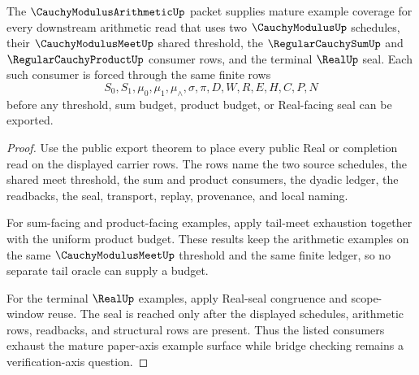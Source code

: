 \begin{theorem}
\label{thm:cauchy-modulus-arithmetic-mature-examples}
The $\CauchyModulusArithmeticUp$ packet supplies mature example coverage for every downstream arithmetic read that uses two $\CauchyModulusUp$ schedules, their $\CauchyModulusMeetUp$ shared threshold, the $\RegularCauchySumUp$ and $\RegularCauchyProductUp$ consumer rows, and the terminal $\RealUp$ seal. Each such consumer is forced through the same finite rows
$$
S_0,S_1,\mu_0,\mu_1,\mu_{\wedge},\sigma,\pi,D,W,R,E,H,C,P,N
$$
before any threshold, sum budget, product budget, or Real-facing seal can be exported.
\end{theorem}
\begin{proof}
Use the public export theorem to place every public Real or completion read on the displayed carrier rows. The rows name the two source schedules, the shared meet threshold, the sum and product consumers, the dyadic ledger, the readbacks, the seal, transport, replay, provenance, and local naming.

For sum-facing and product-facing examples, apply tail-meet exhaustion together with the uniform product budget. These results keep the arithmetic examples on the same $\CauchyModulusMeetUp$ threshold and the same finite ledger, so no separate tail oracle can supply a budget.

For the terminal $\RealUp$ examples, apply Real-seal congruence and scope-window reuse. The seal is reached only after the displayed schedules, arithmetic rows, readbacks, and structural rows are present. Thus the listed consumers exhaust the mature paper-axis example surface while bridge checking remains a verification-axis question.
\end{proof}


